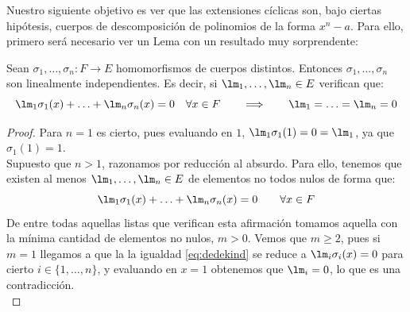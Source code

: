 Nuestro siguiente objetivo es ver que las extensiones cíclicas son, bajo ciertas hipótesis, cuerpos de descomposición de polinomios de la forma $x^n-a$. Para ello, primero será necesario ver un Lema con un resultado muy sorprendente:

\begin{lema}
    Sean $\sigma_1,\ldots,\sigma_n:F\to E$ homomorfismos de cuerpos distintos. Entonces $\sigma_1, \ldots, \sigma_n$  son linealmente independientes. Es decir, si $\lm_1, \ldots, \lm_n\in E$ verifican que:
    \begin{equation*}
        \lm_1 \sigma_1(x) + \ldots + \lm_n \sigma_n(x) = 0 \quad \forall x\in F \qquad \Longrightarrow \qquad \lm_1 = \ldots = \lm_n = 0
    \end{equation*}
    \begin{proof} 
        Para $n=1$ es cierto, pues evaluando en $1$, $\lm_1\sigma_1(1) = 0 = \lm_1$, ya que $\sigma_1(1) = 1$.\\
        
        
        Supuesto que $n>1$, razonamos por reducción al absurdo. Para ello, tenemos que existen al menos $\lm_1,\ldots,\lm_n\in E$ de elementos no todos nulos de forma que:
        \begin{equation}\label{eq:dedekind}
            \lm_1\sigma_1(x) + \ldots + \lm_n\sigma_n(x) = 0 \qquad \forall x\in F
        \end{equation}
        De entre todas aquellas listas que verifican esta afirmación tomamos aquella con la mínima cantidad de elementos no nulos, $m>0$. Vemos que $m\geq 2$, pues si $m=1$ llegamos a que la la igualdad \eqref{eq:dedekind} se reduce a $\lm_i\sigma_i(x) = 0$ para cierto $i\in \{1,\ldots,n\}$, y evaluando en $x=1$ obtenemos que $\lm_i = 0$, lo que es una contradicción.\\
        

\end{proof}
\end{lema}

